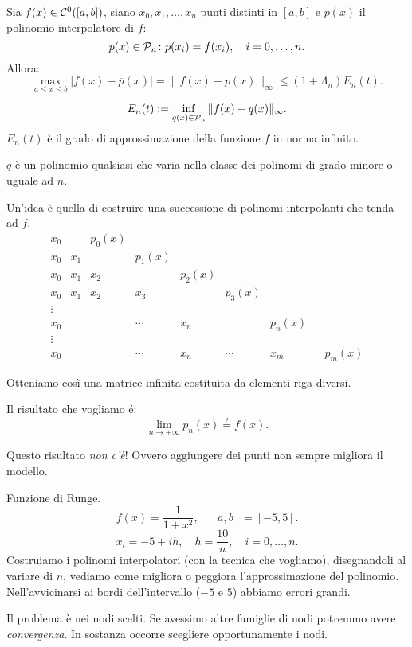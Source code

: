 \begin{teo}\label{teo7.15}
Sia $f(x) \in \mathcal{C}^0([a,b])$, siano $x_0, x_1, \ldots, x_n$ punti distinti in
$[a,b]$ e $p(x)$ il polinomio interpolatore di $f$:
\[p(x) \in \mathcal{P}_n \colon p(x_i) = f(x_i), \quad i=0,\ldots, n.\]
Allora:
\[
\max_{a \leq x \leq b}|f(x)-\overline{p}(x)| = \|f(x) - p(x) \|_{\infty}
\leq \left(1+ \Lambda_n\right) E_n(t).
\]

\[
E_n(t) := \inf_{q(x) \in \mathcal{P}_n} \|f(x)-q(x)\|_\infty.
\]
$E_n(t)$ è il grado di approssimazione della funzione $f$ in norma infinito.
\end{teo}
\begin{osse}
$q$ è un polinomio qualsiasi che varia nella classe dei polinomi di grado
minore o uguale ad $n$.
\end{osse}

Un'idea è quella di costruire una successione di polinomi interpolanti che
tenda ad $f$.
\[
\begin{array}{ccccccccc}
x_0 & &p_0(x) \\
x_0 & x_1 & & p_1(x) \\
x_0 & x_1 & x_2 & &p_2(x) \\
x_0 & x_1 & x_2 & x_3 & &p_3(x) \\
\vdots \\
x_0 &     &    & \cdots & x_n & &p_n(x) \\
\vdots \\
x_0 &     &    &\cdots & x_n & \cdots & x_m & &p_m(x)
\end{array}
\]

Otteniamo così una matrice infinita costituita da elementi riga diversi.

Il risultato che vogliamo é:
\[
\lim_{n \to + \infty}p_n(x) \stackrel{?}{=} f(x).
\]

Questo risultato \emph{non c'è}! Ovvero aggiungere dei punti non sempre
migliora il modello.

\begin{exe} Funzione di Runge.
\[f(x) = \frac{1}{1+ x^2}, \quad [a,b] = [-5,5]. \]
\[x_i = -5 +ih, \quad h = \frac{10}{n}, \quad i = 0, \ldots, n.\]
Costruiamo i polinomi interpolatori (con la tecnica che vogliamo),
disegnandoli al variare di $n$, vediamo come migliora o peggiora
l'approssimazione del polinomio. Nell'avvicinarsi ai bordi dell'intervallo
($-5$ e $5$) abbiamo errori grandi.
\end{exe}
\begin{notabene}
Il problema è nei nodi scelti. Se avessimo altre famiglie di nodi potremmo
avere \emph{convergenza}. In sostanza occorre scegliere opportunamente
i nodi.
\end{notabene}

